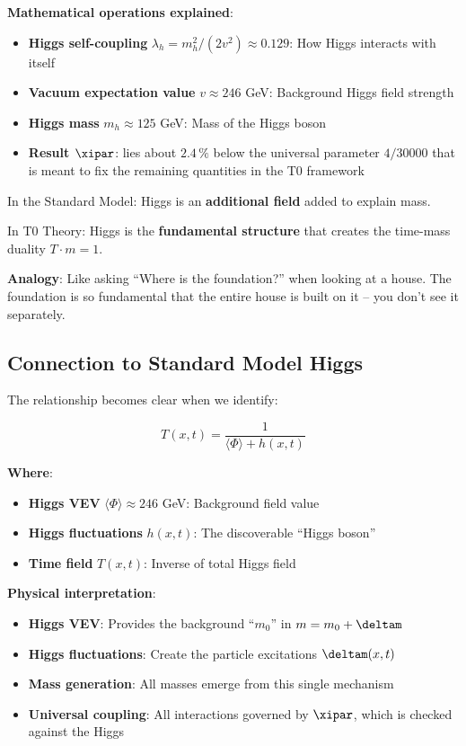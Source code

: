 	\textbf{Mathematical operations explained}:
	\begin{itemize}
		\item \textbf{Higgs self-coupling} $\lambda_h = m_h^2/(2v^2) \approx 0.129$: How Higgs interacts with itself
		\item \textbf{Vacuum expectation value} $v \approx 246$ GeV: Background Higgs field strength
		\item \textbf{Higgs mass} $m_h \approx 125$ GeV: Mass of the Higgs boson
		\item \textbf{Result $\xipar$}: lies about $2.4\,\%$ below the universal parameter $4/30000$ that is meant to fix the remaining quantities in the T0 framework
	\end{itemize}
	
	\begin{tcolorbox}[colback=purple!5!white,colframe=purple!75!black,title=Higgs Integration in T0 Theory]
		In the Standard Model: Higgs is an \textbf{additional field} added to explain mass.
		
		In T0 Theory: Higgs is the \textbf{fundamental structure} that creates the time-mass duality $T \cdot m = 1$.
		
		\textbf{Analogy}: Like asking ``Where is the foundation?'' when looking at a house. The foundation is so fundamental that the entire house is built on it -- you don't see it separately.
	\end{tcolorbox}
	
	\subsection{Connection to Standard Model Higgs}
	
	The relationship becomes clear when we identify:
	
	\begin{equation}
		T(x,t) = \frac{1}{\langle\Phi\rangle + h(x,t)}
	\end{equation}
	
	\textbf{Where}:
	\begin{itemize}
		\item \textbf{Higgs VEV} $\langle\Phi\rangle \approx 246$ GeV: Background field value
		\item \textbf{Higgs fluctuations} $h(x,t)$: The discoverable ``Higgs boson''
		\item \textbf{Time field} $T(x,t)$: Inverse of total Higgs field
	\end{itemize}
	
	\textbf{Physical interpretation}:
	\begin{itemize}
		\item \textbf{Higgs VEV}: Provides the background ``$m_0$'' in $m = m_0 + \deltam$
		\item \textbf{Higgs fluctuations}: Create the particle excitations $\deltam(x,t)$
		\item \textbf{Mass generation}: All masses emerge from this single mechanism
		\item \textbf{Universal coupling}: All interactions governed by $\xipar$, which is checked against the Higgs
	\end{itemize}
	
